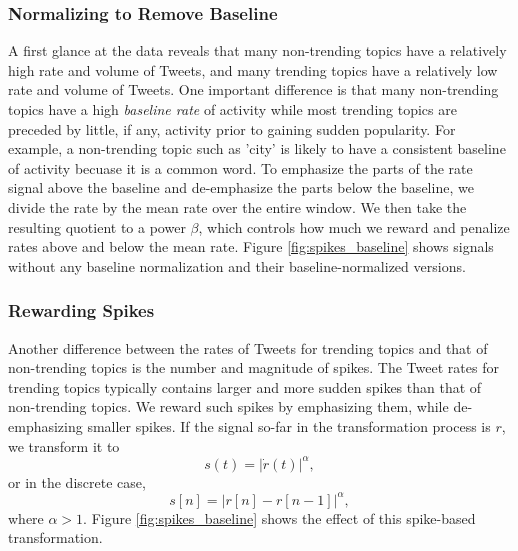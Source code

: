 \subsubsection{Normalizing to Remove Baseline}
A first glance at the data reveals that many non-trending topics have a
relatively high rate and volume of Tweets, and many trending topics have a
relatively low rate and volume of Tweets. One important difference is that many
non-trending topics have a high {\em baseline rate} of activity while most
trending topics are preceded by little, if any, activity prior to gaining sudden
popularity. For example, a non-trending topic such as 'city' is likely to have a
consistent baseline of activity becuase it is a common word. To emphasize the
parts of the rate signal above the baseline and de-emphasize the parts below the
baseline, we divide the rate by the mean rate over the entire window. We then
take the resulting quotient to a power $\beta$, which controls how much we
reward and penalize rates above and below the mean rate. Figure
\ref{fig:spikes_baseline} shows signals without any baseline normalization and
their baseline-normalized versions.

\subsubsection{Rewarding Spikes}
Another difference between the rates of Tweets for trending topics and that of
non-trending topics is the number and magnitude of spikes. The Tweet rates for
trending topics typically contains larger and more sudden spikes than that of
non-trending topics. We reward such spikes by emphasizing them, while
de-emphasizing smaller spikes. If the signal so-far in the transformation
process is $r$, we transform it to \[ s(t) = |\dot{r}(t)|^{\alpha},\] or in the
discrete case, \[ s[n] = |r[n] - r[n-1]|^{\alpha},\] where $\alpha > 1$. Figure
\ref{fig:spikes_baseline} shows the effect of this spike-based transformation.

